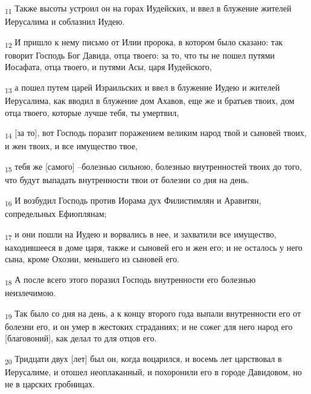 \begin{tcolorbox}
\textsubscript{11} Также высоты устроил он на горах Иудейских, и ввел в блужение жителей Иерусалима и соблазнил Иудею.
\end{tcolorbox}
\begin{tcolorbox}
\textsubscript{12} И пришло к нему письмо от Илии пророка, в котором было сказано: так говорит Господь Бог Давида, отца твоего: за то, что ты не пошел путями Иосафата, отца твоего, и путями Асы, царя Иудейского,
\end{tcolorbox}
\begin{tcolorbox}
\textsubscript{13} а пошел путем царей Израильских и ввел в блужение Иудею и жителей Иерусалима, как вводил в блужение дом Ахавов, еще же и братьев твоих, дом отца твоего, которые лучше тебя, ты умертвил,
\end{tcolorbox}
\begin{tcolorbox}
\textsubscript{14} [за то], вот Господь поразит поражением великим народ твой и сыновей твоих, и жен твоих, и все имущество твое,
\end{tcolorbox}
\begin{tcolorbox}
\textsubscript{15} тебя же [самого] --болезнью сильною, болезнью внутренностей твоих до того, что будут выпадать внутренности твои от болезни со дня на день.
\end{tcolorbox}
\begin{tcolorbox}
\textsubscript{16} И возбудил Господь против Иорама дух Филистимлян и Аравитян, сопредельных Ефиоплянам;
\end{tcolorbox}
\begin{tcolorbox}
\textsubscript{17} и они пошли на Иудею и ворвались в нее, и захватили все имущество, находившееся в доме царя, также и сыновей его и жен его; и не осталось у него сына, кроме Охозии, меньшего из сыновей его.
\end{tcolorbox}
\begin{tcolorbox}
\textsubscript{18} А после всего этого поразил Господь внутренности его болезнью неизлечимою.
\end{tcolorbox}
\begin{tcolorbox}
\textsubscript{19} Так было со дня на день, а к концу второго года выпали внутренности его от болезни его, и он умер в жестоких страданиях; и не сожег для него народ его [благовоний], как делал то для отцов его.
\end{tcolorbox}
\begin{tcolorbox}
\textsubscript{20} Тридцати двух [лет] был он, когда воцарился, и восемь лет царствовал в Иерусалиме, и отошел неоплаканный, и похоронили его в городе Давидовом, но не в царских гробницах.
\end{tcolorbox}
